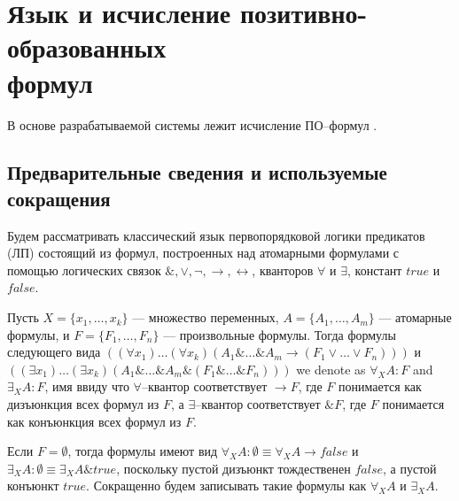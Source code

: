 
\section[Язык и исчисление позитивно-образованных формул]{Язык и исчисление позитивно-образованных\\ формул}

В основе разрабатываемой системы лежит исчисление ПО--формул \cite{ICDS2000, DavydovX, SNV1990, mais}.


\subsection{Предварительные сведения и используемые сокращения}
Будем рассматривать классический язык первопорядковой логики предикатов (ЛП) состоящий из формул, построенных над атомарными формулами с помощью логических связок $\&, \vee, \neg, \rightarrow, \leftrightarrow$, кванторов $\forall$ и $\exists$, констант $true$ и $false$.

Пусть $X = \{x_1,\ldots,x_k\}$ --- множество переменных, $A = \{A_1,\ldots,A_m\}$ --- атомарные формулы, и $F = \{F_1,\ldots,F_n\}$ --- произвольные формулы. Тогда формулы следующего вида $((\forall x_1) \ldots (\forall x_k) (A_1 \& \ldots \& A_m \rightarrow (F_1 \vee \ldots \vee F_n)))$ и $((\exists x_1) \ldots (\exists x_k) (A_1 \& \ldots \& A_m \& (F_1 \& \ldots \& F_n)))$ we denote as $\forall_XA\colon F$ and $\exists_XA\colon F$, имя ввиду что $\forall$--квантор соответствует $\rightarrow F$, где $F$ понимается как дизъюнкция всех формул из $F$, а $\exists$--квантор соответствует $\& F$, где $F$ понимается как конъюнкция всех формул из $F$.

Если $F = \emptyset$, тогда формулы имеют вид $\forall_XA\colon\emptyset \equiv \forall_XA \rightarrow false$ и $\exists_XA\colon\emptyset \equiv \exists_XA \& true$, поскольку пустой дизъюнкт тождественен $false$, а пустой конъюнкт $true$. Сокращенно будем записывать такие формулы как $\forall_XA$ и $\exists_XA$.

